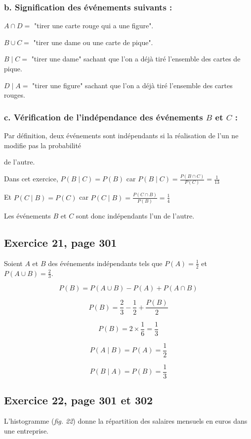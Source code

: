 \documentclass[10pt]{article}
\begin{document}
\subsubsection*{b. Signification des événements suivants :}

\hspace{15pt}$A\cap D=$ "tirer une carte rouge qui a une figure".

$B\cup C=$ "tirer une dame ou une carte de pique".

$B\mid C=$ "tirer une dame" sachant que l'on a déjà tiré l'ensemble des cartes de pique.

$D\mid A=$ "tirer une figure" sachant que l'on a déjà tiré l'ensemble des cartes rouges.

\subsubsection*{c. Vérification de l'indépendance des événements $B$ et $C$ :}

\hspace{15pt}Par définition, deux événements sont indépendants si la réalisation de l'un ne modifie pas la probabilité 

de l'autre. 

Dans cet exercice, $P(B\mid C)=P(B)$ car $\displaystyle P(B\mid C)=\frac{P(B\cap C)}{P(C)}=\frac{1}{13}$

Et $P(C\mid B)=P(C)$ car $\displaystyle P(C\mid B)=\frac{P(C\cap B)}{P(B)}=\frac{1}{4}$\vspace{4pt}

Les événements $B$ et $C$ sont donc indépendants l'un de l'autre.



\subsection*{Exercice 21, page 301}
Soient $A$ et $B$ des événements indépendants tels que $\displaystyle P(A)=\frac{1}{2}$ et $\displaystyle P(A\cup B)=\frac{2}{3}$.

$$P(B)=P(A\cup B)-P(A)+P(A\cap B)$$

$$P(B)=\frac{2}{3}-\frac{1}{2}+\frac{P(B)}{2}$$

$$P(B)=2\times \frac{1}{6}=\frac{1}{3}$$

$$P(A\mid B)=P(A)=\frac{1}{2}$$

$$P(B\mid A)=P(B)=\frac{1}{3}$$
\subsection*{Exercice 22, page 301 et 302}
L'histogramme (\textit{fig. 22}) donne la répartition des salaires mensuels en euros dans une entreprise.
\end{document}
